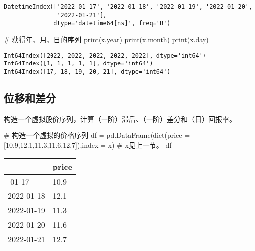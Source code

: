 \documentclass[
  letterpaper,
  DIV=11,
  numbers=noendperiod]{scrreprt}
\newenvironment{Shaded}{\begin{snugshade}}{\end{snugshade}}
\newcommand{\BuiltInTok}[1]{\textcolor[rgb]{0.00,0.23,0.31}{#1}}
\newcommand{\CommentTok}[1]{\textcolor[rgb]{0.37,0.37,0.37}{#1}}
\newcommand{\FloatTok}[1]{\textcolor[rgb]{0.68,0.00,0.00}{#1}}
\newcommand{\NormalTok}[1]{\textcolor[rgb]{0.00,0.23,0.31}{#1}}
\newcommand{\OperatorTok}[1]{\textcolor[rgb]{0.37,0.37,0.37}{#1}}
\begin{document}
\begin{verbatim}
DatetimeIndex(['2022-01-17', '2022-01-18', '2022-01-19', '2022-01-20',
               '2022-01-21'],
              dtype='datetime64[ns]', freq='B')
\end{verbatim}

\begin{Shaded}
\begin{Highlighting}[]
\CommentTok{\# 获得年、月、日的序列}
\BuiltInTok{print}\NormalTok{(x.year)}
\BuiltInTok{print}\NormalTok{(x.month)}
\BuiltInTok{print}\NormalTok{(x.day)}
\end{Highlighting}
\end{Shaded}

\begin{verbatim}
Int64Index([2022, 2022, 2022, 2022, 2022], dtype='int64')
Int64Index([1, 1, 1, 1, 1], dtype='int64')
Int64Index([17, 18, 19, 20, 21], dtype='int64')
\end{verbatim}

\hypertarget{ux4f4dux79fbux548cux5deeux5206}{%
\subsection{位移和差分}\label{ux4f4dux79fbux548cux5deeux5206}}

构造一个虚拟股价序列，计算（一阶）滞后、（一阶）差分和（日）回报率。

\begin{Shaded}
\begin{Highlighting}[]
\CommentTok{\# 构造一个虚拟的价格序列}
\NormalTok{df }\OperatorTok{=}\NormalTok{ pd.DataFrame(}\BuiltInTok{dict}\NormalTok{(price }\OperatorTok{=}\NormalTok{ [}\FloatTok{10.9}\NormalTok{,}\FloatTok{12.1}\NormalTok{,}\FloatTok{11.3}\NormalTok{,}\FloatTok{11.6}\NormalTok{,}\FloatTok{12.7}\NormalTok{]),index }\OperatorTok{=}\NormalTok{ x) }\CommentTok{\# x见上一节。}
\NormalTok{df}
\end{Highlighting}
\end{Shaded}

\begin{longtable}[]{@{}ll@{}}
\toprule\noalign{}
& price \\
\midrule\noalign{}
\endhead
\bottomrule\noalign{}
\endlastfoot
2022-01-17 & 10.9 \\
2022-01-18 & 12.1 \\
2022-01-19 & 11.3 \\
2022-01-20 & 11.6 \\
2022-01-21 & 12.7 \\
\end{longtable}
\end{document}
